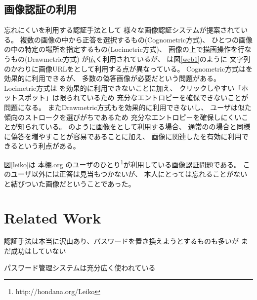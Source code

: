 \documentclass{article}
\begin{document}
\subsection{画像認証の利用}

忘れにくい{\EM}を利用する認証手法として
様々な画像認証システム\cite{Biddle:2012:GPL:2333112.2333114}\cite{GraphicalPasswords}\cite{小池英樹:2006-05-15}が提案されている。
複数の画像の中から正答を選択するもの(Cognometric方式)、
ひとつの画像の中の特定の場所を指定するもの(Locimetric方式)、
画像の上で描画操作を行なうもの(Drawmetric方式)
が広く利用されているが\cite{Biddle:2012:GPL:2333112.2333114}\cite{GraphicalPasswords}\cite{Guideline}、
{\EP}は図\ref{web1}のように
文字列のかわりに画像URLを{\SQ}として利用する点が異なっている。
%
Cognometric方式は{\EM}を効果的に利用できるが、
多数の偽答画像が必要だという問題がある。
Locimetric方式は
{\EM}を効果的に利用できないことに加え、
クリックしやすい「ホットスポット」は限られているため
充分なエントロピーを確保できないことが問題になる\cite{Dirik:2007:MUC:1280680.1280684}。
またDrawmetric方式も{\EM}を効果的に利用できないし、
ユーザは似た傾向のストロークを選びがちであるため
充分なエントロピーを確保しにくいことが知られている\cite{Nali}。
%
{\EP}のように画像を{\SQ}として利用する場合、
通常の{\SQ}の場合と同様に偽答を増やすことが容易であることに加え、
画像に関連した{\EM}を有効に利用できるという利点がある\cite{増井:CSS}。

図\ref{leiko}は
本棚.org\cite{hondana}\cite{hondanaorg}
のユーザのひとり\footnote{
  \textsf{http://hondana.org/Leiko}
}が利用している画像認証問題である。
このユーザ以外には正答は見当もつかないが、
本人にとっては忘れることがない{\EM}と結びついた画像だということであった。

% 
% 
% 
%

\section{Related Work}

認証手法は本当に沢山あり、パスワードを置き換えようとするものも多いが
まだ成功はしていない

パスワード管理システムは充分広く使われている

\cite{Stobert:2014:PMD:2683467.2683471} %

% 
% 
% 
% 
% 
%
\end{document}
